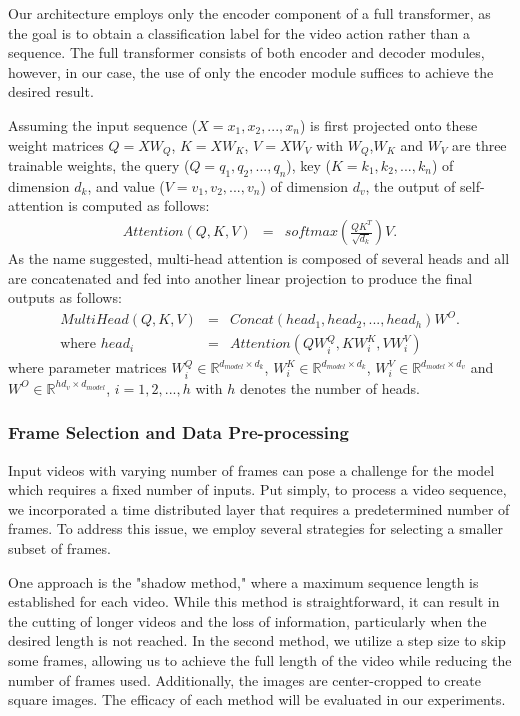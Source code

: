 \documentclass[fleqn,10pt]{wlscirep}
\begin{document}
Our architecture employs only the encoder component of a full transformer, as the goal is to obtain a classification label for the video action rather than a sequence. The full transformer consists of both encoder and decoder modules, however, in our case, the use of only the encoder module suffices to achieve the desired result.

Assuming the input sequence ($X={x_1,x_2,...,x_n}$) is first projected onto these weight matrices $Q = XW_Q$, $K = XW_K$, $V = XW_V$ with $W_Q$,$W_K$ and $W_V$ are three trainable weights, the query ($Q = q_1,q_2,...,q_n$), key ($K = k_1,k_2,...,k_n$) of dimension $d_k$, and value ($V = v_1,v_2,...,v_n$) of dimension $d_v$, the output of self-attention is computed as follows:
\begin{equation}
\begin{array}{ccl}
Attention(Q,K,V)  & = & softmax(\frac{QK^T}{\sqrt{d_k}})V.
\end{array} 
\label{eq:selfattention}
\end{equation}
As the name suggested, multi-head attention is composed of several heads and all are concatenated and fed into another linear projection to produce the final outputs as follows:
\begin{eqnarray}
MultiHead(Q,K,V)  & = & Concat(head_1,head_2,...,head_h)W^O. \\
\text{where  } head_i & = &Attention(QW^Q_i,KW^K_i,VW^V_i)
\label{eq:multihead}
\end{eqnarray}
where parameter matrices $W^Q_i\in\mathbb{R}^{d_{model} \times d_k}$, $W^K_i\in\mathbb{R}^{d_{model} \times d_k}$, $W^V_i\in\mathbb{R}^{d_{model} \times d_v}$ and $W^O\in\mathbb{R}^{hd_v \times d_{model}}$, $i=1,2,...,h$ with $h$ denotes the number of heads.

\subsubsection{Frame Selection and Data Pre-processing}


Input videos with varying number of frames can pose a challenge for the model which requires a fixed number of inputs. Put simply, to process a video sequence, we incorporated a time distributed layer that requires a predetermined number of frames. To address this issue, we employ several strategies for selecting a smaller subset of frames.

One approach is the "shadow method," where a maximum sequence length is established for each video. While this method is straightforward, it can result in the cutting of longer videos and the loss of information, particularly when the desired length is not reached. In the second method, we utilize a step size to skip some frames, allowing us to achieve the full length of the video while reducing the number of frames used. Additionally, the images are center-cropped to create square images. The efficacy of each method will be evaluated in our experiments.
\end{document}
